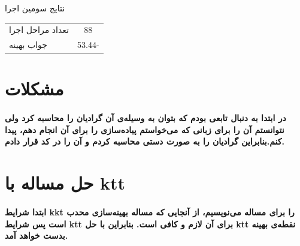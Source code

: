 \documentclass[paper=a4, fontsize=11pt]{article}
\numberwithin{equation}{section} %
\numberwithin{figure}{section} %
\numberwithin{table}{section} %
\begin{document}
\begin{center}
	نتایج سومین اجرا\\
	\begin{tabular}{| l | c |}
		\hline
		تعداد مراحل اجرا & 88 \\
		جواب بهینه & 53.44- \\
		\hline
	\end{tabular}
\end{center}

\section{مشکلات}
\paragraph{
	در ابتدا به دنبال تابعی بودم که بتوان به وسیله‌ی آن گرادیان را محاسبه کرد ولی نتوانستم آن را برای زبانی
	که می‌خواستم پیاده‌سازی را برای آن انجام دهم، پیدا کنم.بنابراین گرادیان را به صورت دستی محاسبه کردم و آن را در کد قرار دادم.
}

\section{حل مساله با ktt}
\paragraph{
	ابتدا شرایط kkt را برای مساله می‌نویسیم، از آنجایی که مساله بهینه‌سازی محدب است پس شرایط ktt برای آن لازم و کافی است.
	بنابراین با حل ktt نقطه‌ی بهینه بدست خواهد آمد.
}
\end{document}
